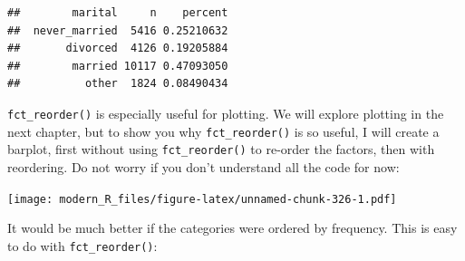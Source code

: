 \documentclass[]{gitbook}
\newenvironment{Shaded}{\begin{snugshade}}{\end{snugshade}}
\newcommand{\DataTypeTok}[1]{\textcolor[rgb]{0.13,0.29,0.53}{#1}}
\newcommand{\FloatTok}[1]{\textcolor[rgb]{0.00,0.00,0.81}{#1}}
\newcommand{\KeywordTok}[1]{\textcolor[rgb]{0.13,0.29,0.53}{\textbf{#1}}}
\newcommand{\NormalTok}[1]{#1}
\newcommand{\OperatorTok}[1]{\textcolor[rgb]{0.81,0.36,0.00}{\textbf{#1}}}
\newcommand{\OtherTok}[1]{\textcolor[rgb]{0.56,0.35,0.01}{#1}}
\newcommand{\StringTok}[1]{\textcolor[rgb]{0.31,0.60,0.02}{#1}}
\begin{document}
\begin{Shaded}
\end{Shaded}

\begin{verbatim}
##        marital     n    percent
##  never_married  5416 0.25210632
##       divorced  4126 0.19205884
##        married 10117 0.47093050
##          other  1824 0.08490434
\end{verbatim}

\texttt{fct\_reorder()} is especially useful for plotting. We will explore plotting in the next chapter,
but to show you why \texttt{fct\_reorder()} is so useful, I will create a barplot, first without
using \texttt{fct\_reorder()} to re-order the factors, then with reordering. Do not worry if you don't
understand all the code for now:

\begin{Shaded}
\end{Shaded}

\texttt{[image: modern\_R\_files/figure-latex/unnamed-chunk-326-1.pdf]}

It would be much better if the categories were ordered by frequency. This is easy to do with
\texttt{fct\_reorder()}:

\begin{Shaded}
\end{Shaded}
\end{document}
